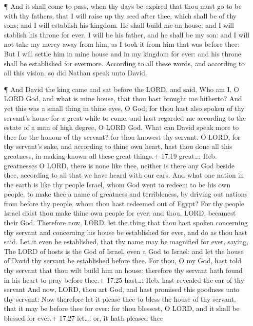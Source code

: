  ¶ And it shall come to pass, when thy days be expired that
thou must go to be with thy fathers, that I will raise up thy seed after
thee, which shall be of thy sons; and I will establish his kingdom.
 He shall build me an house, and I will stablish his throne
for ever.  I will be his father, and he shall be my son:
and I will not take my mercy away from him, as I took it from him that
was before thee:  But I will settle him in mine house and
in my kingdom for ever: and his throne shall be established for
evermore.  According to all these words, and according to
all this vision, so did Nathan speak unto David.

 ¶ And David the king came and sat before the LORD, and
said, Who am I, O LORD God, and what is mine house, that thou hast
brought me hitherto?  And yet this was a small thing in
thine eyes, O God; for thou hast also spoken of thy servant's house for
a great while to come, and hast regarded me according to the estate of a
man of high degree, O LORD God.  What can David speak more
to thee for the honour of thy servant? for thou knowest thy servant.
 O LORD, for thy servant's sake, and according to thine own
heart, hast thou done all this greatness, in making known all these
great things.+ 17.19 great\ldots: Heb. greatnesses  O LORD,
there is none like thee, neither is there any God beside thee, according
to all that we have heard with our ears.  And what one
nation in the earth is like thy people Israel, whom God went to redeem
to be his own people, to make thee a name of greatness and terribleness,
by driving out nations from before thy people, whom thou hast redeemed
out of Egypt?  For thy people Israel didst thou make thine
own people for ever; and thou, LORD, becamest their God. 
Therefore now, LORD, let the thing that thou hast spoken concerning thy
servant and concerning his house be established for ever, and do as thou
hast said.  Let it even be established, that thy name may
be magnified for ever, saying, The LORD of hosts is the God of Israel,
even a God to Israel: and let the house of David thy servant be
established before thee.  For thou, O my God, hast told thy
servant that thou wilt build him an house: therefore thy servant hath
found in his heart to pray before thee.+ 17.25 hast\ldots: Heb. hast
revealed the ear of thy servant  And now, LORD, thou art
God, and hast promised this goodness unto thy servant:  Now
therefore let it please thee to bless the house of thy servant, that it
may be before thee for ever: for thou blessest, O LORD, and it shall be
blessed for ever.+ 17.27 let\ldots: or, it hath pleased thee

